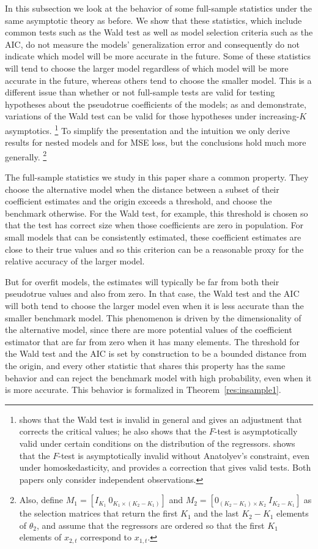 \documentclass[12pt]{article}
\begin{document}
In this subsection we look at the behavior of some full-sample
statistics under the same asymptotic theory as before.  We show that
these statistics, which include common tests such as the Wald test as
well as model selection criteria such as the AIC, do not measure the
models' generalization error and consequently do not indicate which
model will be more accurate in the future. Some of these statistics
will tend to choose the larger model regardless of which model will be
more accurate in the future, whereas others tend to choose the smaller
model.  This is a different issue than whether or not full-sample
tests are valid for testing hypotheses about the pseudotrue
coefficients of the models; as \citet{Cal:11c} and \citet{Ana:12}
demonstrate, variations of the Wald test can be valid for those
hypotheses under increasing-$K$ asymptotics.%
\footnote{\citet{Ana:12} shows that the Wald test is invalid in
  general and gives an adjustment that corrects the critical values;
  he also shows that the $F$-test is asymptotically valid under
  certain conditions on the distribution of the regressors.
  \citet{Cal:11c} shows that the $F$-test is asymptotically invalid
  without Anatolyev's constraint, even under homoskedasticity, and
  provides a correction that gives valid tests.  Both papers only
  consider independent observations.} %
To simplify the presentation and the intuition we only derive results
for nested models and for MSE loss, but the conclusions hold much more
generally.%
\footnote{Also, define $M_1 = [I_{K_1} \ 0_{K_1 \times (K_2 - K_1)}]$
  and $M_2 = [0_{(K_2 - K_1) \times K_2} \ I_{K_2 - K_1}]$ as the
  selection matrices that return the first $K_1$ and the last $K_2 -
  K_1$ elements of $\theta_2$, and assume that the regressors are
  ordered so that the first $K_1$ elements of $x_{2,t}$ correspond to
  $x_{1,t}$.} %

The full-sample statistics we study in this paper share a common
property. They choose the alternative model when the distance between
a subset of their coefficient estimates and the origin exceeds a
threshold, and choose the benchmark otherwise. For the Wald test, for
example, this threshold is chosen so that the test has correct size
when those coefficients are zero in population. For small models that
can be consistently estimated, these coefficient estimates are close
to their true values and so this criterion can be a reasonable proxy
for the relative accuracy of the larger model.

But for overfit models, the estimates will typically be far from both
their pseudotrue values and also from zero. In that case, the Wald test and
the AIC will both tend to choose the larger model even when it is less
accurate than the smaller benchmark model. This phenomenon is driven
by the dimensionality of the alternative model, since there are more
potential values of the coefficient estimator that are far from zero
when it has many elements. The threshold for the Wald test and the AIC
is set by construction to be a bounded distance from the origin, and
every other statistic that shares this property has the same behavior
and can reject the benchmark model with high probability, even when
it is more accurate. This behavior is
formalized in Theorem~\ref{res:insample1}.
\end{document}
